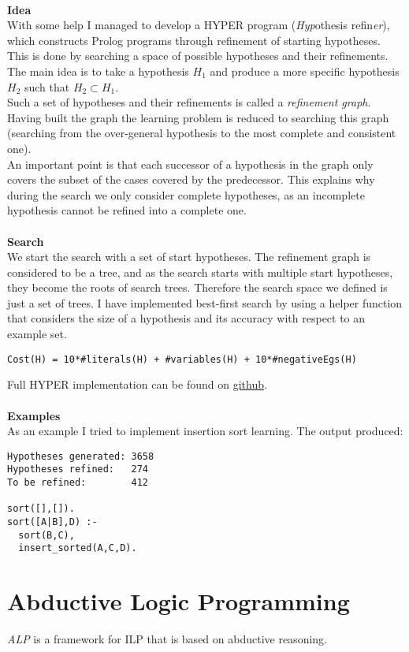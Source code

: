\documentclass[11pt]{article}
\begin{document}
\paragraph{}
\textbf{Idea}\\
With some help I managed to develop a HYPER program (\emph{Hyp}othesis refin\emph{er}), which constructs Prolog programs through refinement of starting hypotheses. \\ This is done by searching a space of possible hypotheses and their refinements. The main idea is to take a hypothesis \emph{$H_1$} and produce a more specific hypothesis \emph{$H_2$} such that $H_2 \subset H_1$.\\
Such a set of hypotheses and their refinements is called a \emph{refinement graph}.\\Having built the graph the learning problem is reduced to searching this graph (searching from the over-general hypothesis to the most complete and consistent one).\\
An important point is that each successor of a hypothesis in the graph only covers the subset of the cases covered by the predecessor. This explains why during the search we only consider complete hypotheses, as an incomplete hypothesis cannot be refined into a complete one.
\paragraph{}
\textbf{Search}\\
We start the search with a set of start hypotheses. The refinement graph is considered to be a tree, and as the search starts with multiple start hypotheses, they become the roots of search trees. Therefore the search space we defined is just a set of trees. I have implemented best-first search by using a helper function that considers the size of a hypothesis and its accuracy with respect to an example set.
\begin{lstlisting}
Cost(H) = 10*#literals(H) + #variables(H) + 10*#negativeEgs(H)
\end{lstlisting} 
Full HYPER implementation can be found on \href{https://github.com/vitpro/ilp_alp_tal/blob/master/src/hyper.pl}{github}.

\paragraph{}
\textbf{Examples}\\
As an example I tried to implement insertion sort learning. The output produced:
\begin{lstlisting}
Hypotheses generated: 3658
Hypotheses refined:   274
To be refined:        412

sort([],[]).
sort([A|B],D) :-
  sort(B,C),
  insert_sorted(A,C,D).  
\end{lstlisting} 

\section{Abductive Logic Programming}
\emph{ALP} is a framework for ILP that is based on abductive reasoning.
\end{document}
